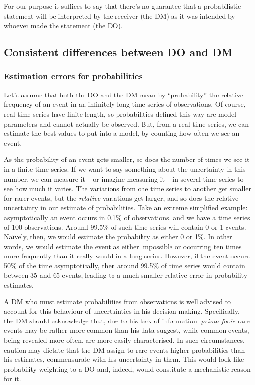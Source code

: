\documentclass[a4paper, 12pt]{article}
\newcommand{\seclabel}[1]{\label{sec:#1}}
\begin{document}
For our purpose it suffices to say that there's no guarantee that a probabilistic statement will be interpreted by the receiver (the DM) as it was intended by whoever made the statement (the DO).

\subsection{Consistent differences between DO and DM \seclabel{condition2}}

\subsubsection*{Estimation errors for probabilities}
Let's assume that both the DO and the DM mean by ``probability'' the relative frequency of an event in an infinitely long time series of observations. Of course, real time series have finite length, so probabilities defined this way are model parameters and cannot actually be observed. But, from a real time series, we can estimate the best values to put into a model, by counting how often we see an event. 

As the probability of an event gets smaller, so does the number of times we see it in a finite time series. If we want to say something about the uncertainty in this number, we can measure it -- or imagine measuring it -- in several time series to see how much it varies. The variations from one time series to another get smaller for rarer events, but the {\it relative} variations get larger, and so does the relative uncertainty in our estimate of probabilities. Take an extreme simplified example: asymptotically an event occurs in 0.1\% of observations, and we have a time series of 100 observations. 
Around 99.5\% of such time series will contain 0 or 1 events. Na\"{i}vely, then, we would estimate the probability as either 0 or 1\%. In other words, we would estimate the event as either impossible or occurring ten times more frequently than it really would in a long series. However, if the event occurs 50\% of the time asymptotically, then around 99.5\% of time series would contain between 35 and 65 events, leading to a much smaller relative error in probability estimates.

A DM who must estimate probabilities from observations is well advised to account for this behaviour of uncertainties in his decision making. Specifically, the DM should acknowledge that, due to his lack of information, {\it prima facie} rare events may be rather more common than his data suggest, while common events, being revealed more often, are more easily characterised. In such circumstances, caution may dictate that the DM assign to rare events higher probabilities than his estimates, commensurate with his uncertainty in them. This would look like probability weighting to a DO and, indeed, would constitute a mechanistic reason for it.
\end{document}
